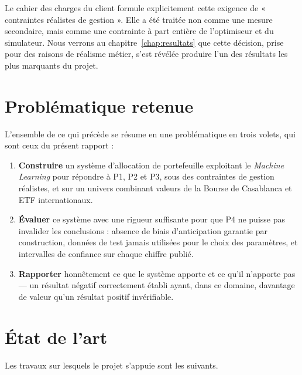 Le cahier des charges du client formule explicitement cette exigence de
« contraintes réalistes de gestion ». Elle a été traitée non comme une mesure
secondaire, mais comme une contrainte à part entière de l'optimiseur et du
simulateur. Nous verrons au chapitre~\ref{chap:resultats} que cette décision, prise
pour des raisons de réalisme métier, s'est révélée produire l'un des résultats les
plus marquants du projet.

\section{Problématique retenue}

L'ensemble de ce qui précède se résume en une problématique en trois volets, qui
sont ceux du présent rapport :

\begin{enumerate}
  \item \textbf{Construire} un système d'allocation de portefeuille exploitant le
        \emph{Machine Learning} pour répondre à P1, P2 et P3, sous des contraintes
        de gestion réalistes, et sur un univers combinant valeurs de la Bourse de
        Casablanca et ETF internationaux.
  \item \textbf{Évaluer} ce système avec une rigueur suffisante pour que P4 ne
        puisse pas invalider les conclusions : absence de biais d'anticipation
        garantie par construction, données de test jamais utilisées pour le choix
        des paramètres, et intervalles de confiance sur chaque chiffre publié.
  \item \textbf{Rapporter} honnêtement ce que le système apporte et ce qu'il
        n'apporte pas — un résultat négatif correctement établi ayant, dans ce
        domaine, davantage de valeur qu'un résultat positif invérifiable.
\end{enumerate}

\section{État de l'art}

Les travaux sur lesquels le projet s'appuie sont les suivants.

